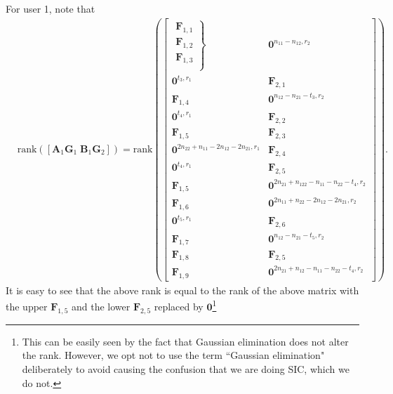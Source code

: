 \documentclass[12pt, draftclsnofoot, onecolumn]{IEEEtran}
\theoremstyle{definition}
\begin{document}
For user 1, note that
\begin{align}\label{demonstrate1}
&\text{rank}([\boldsymbol{A}_1\boldsymbol{G}_1 \; \boldsymbol{B}_1\boldsymbol{G}_2]) =\text{rank}\left(
\begin{bmatrix}
\left. {\begin{array}{*{20}{c}}
\boldsymbol{F}_{1,1} \\
\boldsymbol{F}_{1,2} \\
\boldsymbol{F}_{1,3} \\
\end{array}} \right\} & \boldsymbol{0}^{n_{11}-n_{12},r_2}\\
\boldsymbol{0}^{t_3,r_1}& \boldsymbol{F}_{2,1}\\
\boldsymbol{F}_{1,4} & \boldsymbol{0}^{n_{12}-n_{21}-t_3,r_2}\\
\boldsymbol{0}^{t_4,r_1} & \boldsymbol{F}_{2,2}\\
\boldsymbol{F}_{1,5} & \boldsymbol{F}_{2,3} \\
\boldsymbol{0}^{2n_{22}+n_{11}-2n_{12}-2n_{21},r_1} & \boldsymbol{F}_{2,4}\\
\boldsymbol{0}^{t_4,r_1}&\boldsymbol{F}_{2,5}\\
\boldsymbol{F}_{1,5} &\boldsymbol{0}^{2n_{21}+n_{122}-n_{11}-n_{22}-t_4,r_2} \\
\boldsymbol{F}_{1,6} & \boldsymbol{0}^{2n_{11}+n_{22}-2n_{12}-2n_{21},r_2}  \\
\boldsymbol{0}^{t_5,r_1} & \boldsymbol{F}_{2,6}\\
\boldsymbol{F}_{1,7} & \boldsymbol{0}^{n_{12}-n_{21}-t_5,r_2} \\
\boldsymbol{F}_{1,8} & \boldsymbol{F}_{2,5} \\
\boldsymbol{F}_{1,9} & \boldsymbol{0}^{2n_{21}+n_{12}-n_{11}-n_{22}-t_4,r_2}
\end{bmatrix}\right).
\end{align}
It is easy to see that the above rank is equal to the rank of the above matrix with the upper $\boldsymbol{F}_{1,5}$ and the lower $\boldsymbol{F}_{2,5}$ replaced by $\boldsymbol{0}$\footnote{This can be easily seen by the fact that Gaussian elimination does not alter the rank. However, we opt not to use the term ``Gaussian elimination" deliberately to avoid causing the confusion that we are doing SIC, which we do not.}
\end{document}

